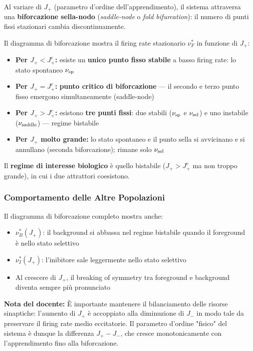 Al variare di $J_+$ (parametro d'ordine dell'apprendimento), il sistema attraversa una \textbf{biforcazione sella-nodo} (\textit{saddle-node} o \textit{fold bifurcation}): il numero di punti fissi stazionari cambia discontinuamente.

Il diagramma di biforcazione mostra il firing rate stazionario $\nu_F^*$ in funzione di $J_+$:

\begin{itemize}
    \item \textbf{Per $J_+ < J_+^c$:} esiste un \textbf{unico punto fisso stabile} a basso firing rate: lo stato spontaneo $\nu_{\rm sp}$
    \item \textbf{Per $J_+ = J_+^c$:} \textbf{punto critico di biforcazione} — il secondo e terzo punto fisso emergono simultaneamente (saddle-node)
    \item \textbf{Per $J_+ > J_+^c$:} esistono \textbf{tre punti fissi}: due stabili ($\nu_{\rm sp}$ e $\nu_{\rm sel}$) e uno instabile ($\nu_{\rm saddle}$) — regime bistabile
    \item \textbf{Per $J_+$ molto grande:} lo stato spontaneo e il punto sella si avvicinano e si annullano (seconda biforcazione); rimane solo $\nu_{\rm sel}$
\end{itemize}

Il \textbf{regime di interesse biologico} è quello bistabile ($J_+ > J_+^c$ ma non troppo grande), in cui i due attrattori coesistono.

\subsubsection{Comportamento delle Altre Popolazioni}

Il diagramma di biforcazione completo mostra anche:
\begin{itemize}
    \item $\nu_B^*(J_+)$: il background si abbassa nel regime bistabile quando il foreground è nello stato selettivo
    \item $\nu_I^*(J_+)$: l'inibitore sale leggermente nello stato selettivo
    \item Al crescere di $J_+$, il breaking of symmetry tra foreground e background diventa sempre più pronunciato
\end{itemize}

\begin{tcolorbox}[colback=gray!5, colframe=gray!40, arc=2mm, boxrule=0.5pt]
\textbf{Nota del docente:} È importante mantenere il bilanciamento delle risorse sinaptiche: l'aumento di $J_+$ è accoppiato alla diminuzione di $J_-$ in modo tale da preservare il firing rate medio eccitatorie. Il parametro d'ordine "fisico" del sistema è dunque la differenza $J_+ - J_-$, che cresce monotonicamente con l'apprendimento fino alla biforcazione.
\end{tcolorbox}



